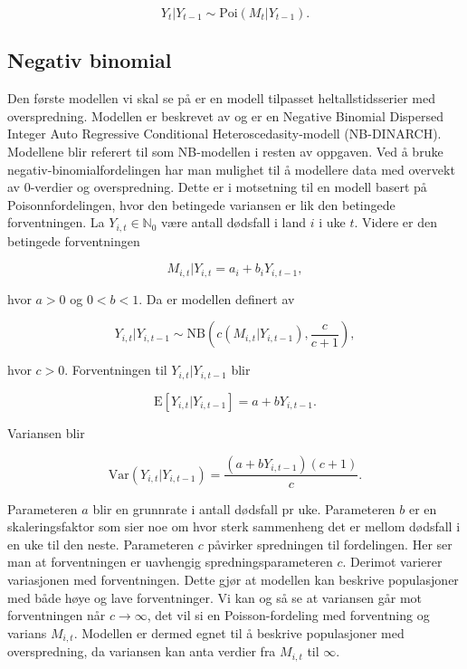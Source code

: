 $$
Y_t|Y_{t-1} \sim \mathrm{Poi}(M_t|Y_{t-1}).
$$

\noindent



\subsection{Negativ binomial}

Den første modellen vi skal se på er en modell tilpasset heltallstidsserier med
overspredning. Modellen er beskrevet av \cite{xu2012model} og er en Negative
Binomial Dispersed Integer Auto Regressive Conditional Heteroscedasity-modell
(NB-DINARCH). Modellene blir referert til som NB-modellen i resten av oppgaven.
Ved å bruke negativ-binomialfordelingen har man mulighet til å modellere data
med overvekt av 0-verdier og overspredning. Dette er i motsetning til en modell
basert på Poisonnfordelingen, hvor den betingede variansen er lik den betingede
forventningen. La $Y_{i, t} \in \mathbb{N}_0$ være antall dødsfall i land $i$ i
uke $t$. Videre er den betingede forventningen

$$
M_{i, t}|Y_{i,t} = a_i + b_iY_{i,t-1},
$$

\noindent
hvor $a > 0$ og $0 < b < 1$. Da er modellen definert av

$$
Y_{i,t}|Y_{i, t-1} \sim 
\mathrm{NB}\left(c(M_{i,t}|Y_{i, t-1}), \frac{c}{c+1}\right),
$$

\noindent
hvor $c >0$. Forventningen til $Y_{i,t}|Y_{i,t-1}$ blir

$$
\mathrm{E}[Y_{i,t}|Y_{i,t-1}] = a + bY_{i,t-1}.
$$

\noindent
Variansen blir

$$
\mathrm{Var}(Y_{i,t}|Y_{i,t-1}) = \frac{(a + bY_{i,t-1})(c + 1)}{c}.
$$

\noindent
Parameteren $a$ blir en grunnrate i antall dødsfall pr uke. Parameteren $b$ er
en skaleringsfaktor som sier noe om hvor sterk sammenheng det er mellom dødsfall
i en uke til den neste. Parameteren $c$ påvirker spredningen til fordelingen.
Her ser man at forventningen er uavhengig spredningsparameteren $c$. Derimot
varierer variasjonen med forventningen. Dette gjør at modellen kan beskrive
populasjoner med både høye og lave forventninger. Vi kan og så se at variansen
går mot forventningen når $c \to \infty$, det vil si en Poisson-fordeling med
forventning og varians $M_{i,t}$. Modellen er dermed egnet til å beskrive
populasjoner med overspredning, da variansen kan anta verdier fra $M_{i,t}$
til $\infty$.

